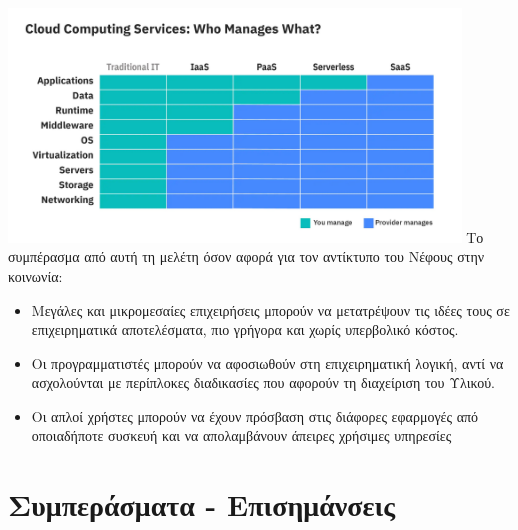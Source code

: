 \documentclass{article}
\begin{document}
\includegraphics[width=120mm]{ibm.jpg}
Το συμπέρασμα από αυτή τη μελέτη όσον αφορά για τον αντίκτυπο του Νέφους στην κοινωνία:
\begin{itemize}
\item Μεγάλες και μικρομεσαίες επιχειρήσεις μπορούν να μετατρέψουν τις ιδέες τους σε επιχειρηματικά αποτελέσματα, πιο γρήγορα και χωρίς υπερβολικό κόστος.
\item Οι προγραμματιστές μπορούν να αφοσιωθούν στη επιχειρηματική λογική, αντί να ασχολούνται με περίπλοκες διαδικασίες που αφορούν τη διαχείριση του Υλικού.
\item	Οι απλοί χρήστες μπορούν να έχουν πρόσβαση στις διάφορες εφαρμογές από οποιαδήποτε συσκευή και να απολαμβάνουν άπειρες χρήσιμες υπηρεσίες
\end{itemize}

\section{Συμπεράσματα - Επισημάνσεις}
\end{document}
